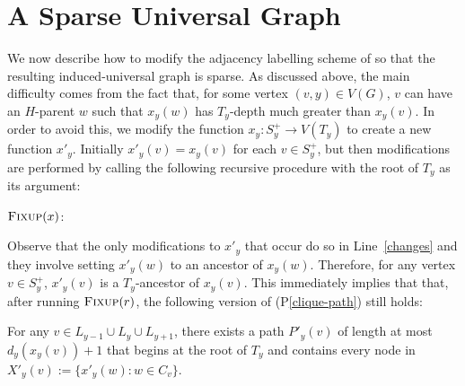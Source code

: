 \documentclass{patmorin}
\newcommand{\pref}[1]{(P\ref{#1})}
\begin{document}
\section{A Sparse Universal Graph}
\label{modifications}

We now describe how to modify the adjacency labelling scheme of \citet{dujmovic.esperet.ea:adjacency} so that the resulting induced-universal graph is sparse.  As discussed above, the main difficulty comes from the fact that, for some vertex $(v,y)\in V(G)$, $v$ can have an $H$-parent $w$ such that $x_y(w)$ has $T_y$-depth much greater than $x_y(v)$.  In order to avoid this, we modify the function $x_y:S^+_y\to V(T_y)$ to create a new function $x'_y$. Initially $x'_y(v)=x_y(v)$ for each $v\in S^+_y$, but then modifications are performed by calling the following recursive procedure with the root of $T_y$ as its argument:

\noindent
\begin{minipage}{\textwidth}
    $\textsc{Fixup}(x)$:
    \begin{algorithmic}[1]
                \ENDIF
            \ENDFOR
        \ENDFOR
    \end{algorithmic}
\end{minipage}


Observe that the only modifications to $x'_y$ that occur do so in Line~\ref{changes} and they involve setting $x'_y(w)$ to an ancestor of $x_y(w)$.  Therefore, for any vertex $v\in S^+_y$, $x'_y(v)$ is a $T_y$-ancestor of $x_y(v)$.  This immediately implies that that, after running $\textsc{Fixup}(r)$, the following version of \pref{clique-path} still holds:

\begin{compactenum}[(P1$'$)]\setcounter{enumi}{1}
    \item For any $v\in L_{y-1}\cup L_y\cup L_{y+1}$, there exists a path $P'_y(v)$ of length at most $d_y(x_y(v))+1$ that begins at the root of $T_y$ and contains every node in $X'_y(v):=\{x'_{y}(w): w\in C_v\}$.\label{clique-path-ii}
\end{compactenum}
\end{document}

